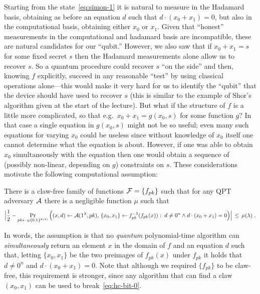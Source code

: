 Starting from the state~\eqref{eq:simon-1} it is natural to measure in the Hadamard basis, obtaining as before an equation $d$ such that $d\cdot(x_0+ x_1)=0$, but also in the computational basis, obtaining either $x_0$ or $x_1$. Given that ``honest'' measurements in the computational and hadamard basis are incompatible, these are natural candidates for our ``qubit.'' However, we also saw that if $x_0+ x_1 = s$ for some fixed secret $s$ then the Hadamard measurements alone allow us to recover $s$. So a quantum procedure could recover $s$ ``on the side'' and then, knowing $f$ explicitly, succeed in any reasonable ``test'' by using classical operations alone---this would make it very hard for us to identify the ``qubit'' that the device should have used to recover $s$ (this is similar to the example of Shor's algorithm given at the start of the lecture). But what if the structure of $f$ is a little more complicated, so that e.g.\ $x_0 + x_1 = g(x_0,s)$ for some function $g$? In that case a single equation in $g(x_0,s)$ might not be so useful; even many such equations for varying $x_0$ could be useless since without knowledge of $x_0$ itself one cannot determine what the equation is about. However, if one was able to obtain $x_0$ simultaneously with the equation then one would obtain a sequence of (possibly non-linear, depending on $g$) constraints on $s$. These considerations motivate the following computational assumption:

\begin{assumption}\label{ass:hc-bit}
There is a claw-free family of functions $\mathcal{F} = \{f_{pk}\}$ such that  for any QPT adversary $\mathcal{A}$ there is a negligible function $\mu$ such that 
\begin{equation}\label{eq:hc-bit-0}
\Big|\frac{1}{2} -  \Pr_{pk\leftarrow_R \{0,1\}^{k(\lambda)}}\Big( (x,d)\leftarrow \mathcal{A}(1^\lambda,pk),\, \{x_0,x_1\}\leftarrow f_{pk}^{-1}(f_{pk}(x)):\; d\neq 0^n \wedge d\cdot ( x_0+x_1) = 0\Big)\Big| \,\leq\, \mu(\lambda)\;.
\end{equation}
\end{assumption}

In words, the assumption is that no \emph{quantum} polynomial-time algorithm can \emph{simultaneously} return an element $x$ in the domain of $f$ and an equation $d$ such that, letting $\{x_0,x_1\}$ be the two preimages of $f_{pk}(x)$ under $f_{pk}$ it holds that $d\neq 0^n$ and $d\cdot (x_0+x_1)=0$. Note that although we required $\{f_{pk}\}$ to be claw-free, this requirement is stronger, since any algorithm that can find a claw $(x_0,x_1)$ can be used to break~\eqref{eq:hc-bit-0}.

